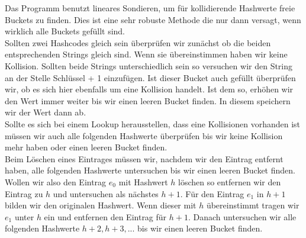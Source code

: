 Das Programm benutzt lineares Sondieren, um für kollidierende Hashwerte freie Buckets zu finden. Dies ist eine sehr robuste Methode die nur dann versagt, wenn wirklich alle Buckets gefüllt sind.\\
Sollten zwei Hashcodes gleich sein überprüfen wir zunächst ob die beiden entsprechenden Strings gleich sind. Wenn sie übereinstimmen haben wir keine Kollision. Sollten beide Strings unterschiedlich sein so versuchen wir den String an  der Stelle Schlüssel + 1 einzufügen. Ist dieser Bucket auch gefüllt überprüfen wir, ob es sich hier ebenfalls um eine Kollision handelt. Ist dem so, erhöhen wir den Wert immer weiter bis wir einen leeren Bucket finden. In diesem speichern wir der Wert dann ab.\\
Sollte es sich bei einem Lookup  herausstellen, dass eine Kollisionen vorhanden ist müssen wir auch alle folgenden Hashwerte überprüfen bis wir keine Kollision mehr haben oder einen leeren Bucket finden.\\
Beim Löschen eines Eintrages müssen wir, nachdem wir den Eintrag entfernt haben, alle folgenden Hashwerte untersuchen bis wir einen leeren Bucket  finden. 
Wollen wir also den Eintrag $e_0$ mit Hashwert $h$ löschen  so entfernen wir den Eintrag zu $h$ und untersuchen als nächstes $h+1$. Für den Eintrag $e_1$ in $h+1$ bilden wir den originalen Hashwert. Wenn dieser mit $h$ übereinstimmt tragen wir $e_1$ unter $h$ ein und entfernen den Eintrag für $h+1$. Danach untersuchen wir alle folgenden Hashwerte $h+2, h+3,...$ bis wir einen leeren Bucket finden. 


